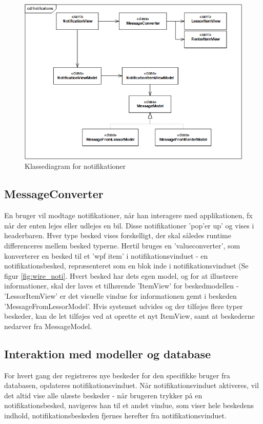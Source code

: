 \documentclass[SoftwareDesign/SoftwareDesign_main.tex]{subfiles}
\begin{document}
\begin{figure}[H]
    \centering
    \includegraphics[width=\textwidth]{SoftwareDesign/MVVMDesigns/Graphics/cd_notification.png}
    \caption{Klassediagram for notifikationer}
    \label{fig:cd_noti}
\end{figure}

\subsection{MessageConverter}
En bruger vil modtage notifikationer, når han interagere med applikationen, fx når der enten lejes eller udlejes en bil. Disse notifikationer 'pop'er up' og vises i headerbaren. Hver type besked vises forskelligt, der skal således runtime differenceres mellem besked typerne. Hertil bruges en 'valueconverter', som konverterer en besked til et 'wpf item' i notifikationsvinduet - en notifikationsbesked, repræsenteret som en blok inde i notifikationsvinduet (Se figur \ref{fig:wire_noti}. Hvert besked har dets egen model, og for at illustrere informationer, skal der laves et tilhørende 'ItemView' for beskedmodellen - 'LessorItemView' er det visuelle vindue for informationen gemt i beskeden 'MessageFromLessorModel'. 
Hvis systemet udvides og der tilføjes flere typer beskeder, kan de let tilføjes ved at oprette et nyt ItemView, samt at beskederne nedarver fra MessageModel. 

\subsection{Interaktion med modeller og database}
For hvert gang der registreres nye beskeder for den specifikke bruger fra databasen, opdateres notifikationsvinduet. Når notifikationsvinduet aktiveres, vil det altid vise alle ulæste beskeder - når brugeren trykker på en notifikationsbesked, navigeres han til et andet vindue, som viser hele beskedens indhold, notifikationsbeskeden fjernes herefter fra notifikationsvinduet. 
\end{document}

